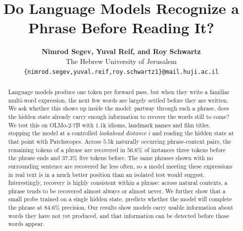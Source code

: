 \documentclass[11pt]{article}
\title{Do Language Models Recognize a Phrase Before Reading It?}
\author{
  \textbf{Nimrod Segev, Yuval Reif, and Roy Schwartz} \\[2pt]
  The Hebrew University of Jerusalem \\[2pt]
  \small\texttt{\{nimrod.segev,yuval.reif,roy.schwartz1\}@mail.huji.ac.il}
}
\begin{document}
\maketitle
\begin{abstract}

Language models produce one token per forward pass, but when they write a
familiar multi-word expression, the next few words are largely settled before
they are written. We ask whether this shows up inside the model: partway through
such a phrase, does the hidden state already carry enough information to recover
the words still to come? We test this on OLMo-2-7B with $1.1$k idioms, landmark
names and film titles, stopping the model at a controlled \emph{lookahead
distance} $i$ and reading the hidden state at that point with Patchscopes. Across
$5.5$k naturally occurring phrase-context pairs, the remaining tokens of a
phrase are
recovered in $56.6\%$ of instances three tokens before the phrase ends and
$37.3\%$ five tokens before. The same phrases shown with no surrounding sentence
are recovered far less often, so a model meeting these expressions in real text
is in a much better position than an isolated test would suggest. Interestingly, recovery is highly consistent within a phrase: across natural contexts, a
phrase tends to be recovered almost always or almost never. We further show that a small probe trained on a single hidden state, predicts whether the model will complete the phrase at $84.6\%$ precision. Our results show models carry usable information about words they
have not yet produced, and that information can be detected before those words
appear. 
\end{abstract}












\end{document}
